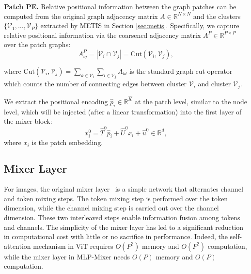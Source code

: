 \documentclass{article}
\begin{document}
\textbf{Patch PE.} Relative positional information between the graph patches can be computed from the original graph adjacency matrix $A\in \mathbb{R}^{N \times N}$ and the clusters $\{\mathcal{V}_1, ..., \mathcal{V}_P\}$ extracted by METIS in Section \ref{sec:metis}. Specifically, we capture relative positional information via the coarsened adjacency matrix $A^{P} \in \mathbb{R}^{P\times P}$ over the patch graphs: 
\begin{equation}
    A^{P}_{ij}=|\mathcal{V}_i \cap \mathcal{V}_j | =\textrm{Cut}(\mathcal{V}_i, \mathcal{V}_j),
    \label{eq: coarsen_adj}
\end{equation}

where $\textrm{Cut}(\mathcal{V}_i, \mathcal{V}_j)=\sum_{k\in \mathcal{V}_i} \sum_{l\in \mathcal{V}_j} A_{kl}$ is the standard graph cut operator which counts the number of connecting edges between cluster $\mathcal{V}_i$ and cluster $\mathcal{V}_j$. 

We extract the positional encoding $\hat p_i\in\mathbb{R}^{\hat K}$ at the patch level, similar to the node level, which will be injected (after a linear transformation) into the first layer of the mixer block:
\begin{equation}
    x_i^0 =  \hat T^0 \hat p_i  + \hat U^0 x_i + \hat u^0 \in \mathbb{R}^d,
    \label{eq: patch pe}
\end{equation}
where $x_i$ is the patch embedding.



\subsection{Mixer Layer}\label{subsec: mixer layer}
For images, the original mixer layer~\citep{tolstikhin2021mlp} is a simple network that alternates channel and token mixing steps. The token mixing step is performed over the token dimension, while the channel mixing step is carried out over the channel dimension. These two interleaved steps enable information fusion among tokens and channels. 
The simplicity of the mixer layer has led to a significant reduction in computational cost with little or no sacrifice in performance. Indeed, the self-attention mechanism in ViT requires $O(P^2)$ memory and $O(P^2)$ computation, while the mixer layer in MLP-Mixer needs $O(P)$ memory and $O(P)$ computation. 
\end{document}
